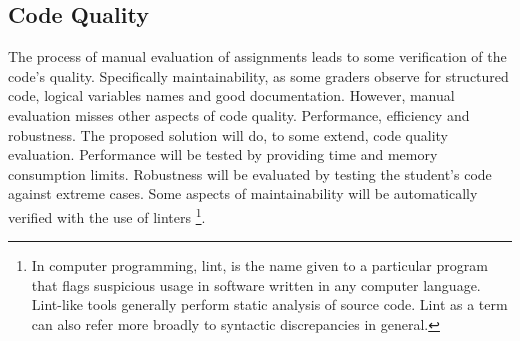 \subsection{Code Quality}
The process of manual evaluation of assignments leads to some verification of
the code's quality. Specifically maintainability, as some graders observe for
structured code, logical variables names and good documentation. However,
manual evaluation misses other aspects of code quality. Performance, efficiency 
and robustness. The proposed solution will do, to some extend, code quality
evaluation. Performance will be tested by providing time and memory consumption
limits. Robustness will be evaluated by testing the student's code against
extreme cases. Some aspects of maintainability will be automatically verified
with the use of linters \footnote{In computer programming, lint, is the name
given to a particular program that flags suspicious usage in software written
in any computer language. Lint-like tools generally perform static analysis of
source code. Lint as a term can also refer more broadly to syntactic
discrepancies in general.}.
